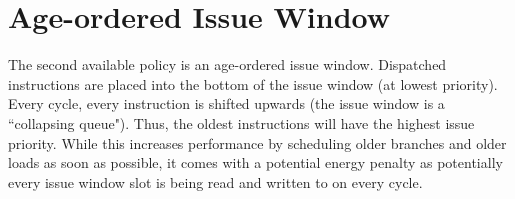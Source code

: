 \section{Age-ordered Issue Window}

The second available policy is an age-ordered issue window.  Dispatched instructions are placed into the bottom of the issue window (at lowest priority). Every cycle, every instruction is shifted upwards (the issue window is a ``collapsing queue").  Thus, the oldest instructions will have the highest issue priority.  While this increases performance by scheduling older branches and older loads as soon as possible, it comes with a potential energy penalty as potentially every issue window slot is being read and written to on every cycle. 

